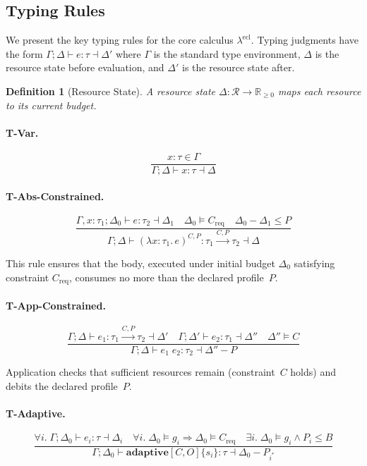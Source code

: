 \documentclass[11pt,a4paper]{article}
\newtheorem{definition}[theorem]{Definition}
\begin{document}
\subsection{Typing Rules}

We present the key typing rules for the core calculus $\lambda^{\mathrm{ecl}}$.
Typing judgments have the form $\Gamma; \Delta \vdash e : \tau \dashv \Delta'$
where $\Gamma$ is the standard type environment, $\Delta$ is the resource state
before evaluation, and $\Delta'$ is the resource state after.

\begin{definition}[Resource State]
A resource state $\Delta : \mathcal{R} \to \mathbb{R}_{\geq 0}$ maps each
resource to its current budget.
\end{definition}

\paragraph{T-Var.}
\[
\frac{x : \tau \in \Gamma}
     {\Gamma; \Delta \vdash x : \tau \dashv \Delta}
\]

\paragraph{T-Abs-Constrained.}
\[
\frac{\Gamma, x : \tau_1; \Delta_0 \vdash e : \tau_2 \dashv \Delta_1
      \quad \Delta_0 \models C_{\mathrm{req}}
      \quad \Delta_0 - \Delta_1 \leq P}
     {\Gamma; \Delta \vdash (\lambda x:\tau_1.\, e)^{C,P} :
       \tau_1 \xrightarrow{C,P} \tau_2 \dashv \Delta}
\]

This rule ensures that the body, executed under initial budget $\Delta_0$
satisfying constraint $C_{\mathrm{req}}$, consumes no more than the declared
profile~$P$.

\paragraph{T-App-Constrained.}
\[
\frac{\Gamma; \Delta \vdash e_1 : \tau_1 \xrightarrow{C,P} \tau_2 \dashv \Delta'
      \quad \Gamma; \Delta' \vdash e_2 : \tau_1 \dashv \Delta''
      \quad \Delta'' \models C}
     {\Gamma; \Delta \vdash e_1\; e_2 : \tau_2 \dashv \Delta'' - P}
\]

Application checks that sufficient resources remain (constraint~$C$ holds) and
debits the declared profile~$P$.

\paragraph{T-Adaptive.}
\[
\frac{\forall i.\; \Gamma; \Delta_0 \vdash e_i : \tau \dashv \Delta_i
      \quad \forall i.\; \Delta_0 \models g_i \Rightarrow \Delta_0 \models C_{\mathrm{req}}
      \quad \exists i.\; \Delta_0 \models g_i \land P_i \leq B}
     {\Gamma; \Delta_0 \vdash \textbf{adaptive}[C,O]\{s_i\} : \tau
       \dashv \Delta_0 - P_{i^*}}
\]
\end{document}
